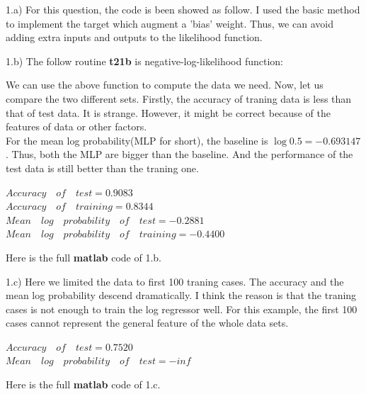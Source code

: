 \documentclass{article}
\begin{document}
1.a) For this question, the code is been showed as follow. I used the basic method to implement the target which augment a 'bias' weight.
Thus, we can avoid adding extra inputs and outputs to the likelihood function.



1.b) The follow routine \textbf{t21b} is negative-log-likelihood function:



We can use the above function to compute the data we need. Now, let us compare the two different sets. Firstly, the accuracy of traning data is
less than that of test data. It is strange. However, it might be correct because of the features of data or other factors. \\
For the mean log probability(MLP for short), the baseline is $\log{0.5} = -0.693147$. Thus, both the MLP are bigger than the baseline.
And the performance of the test data is still better than the traning one.

\begin{center}
$Accuracy\quad of\quad test = 0.9083$ \\
$Accuracy\quad of\quad training = 0.8344$ \\
$Mean\quad log\quad probability\quad of\quad test= -0.2881$ \\
$Mean\quad log\quad probability\quad of\quad training= -0.4400$
 \end{center}

Here is the full \textbf{matlab} code of 1.b.



1.c) Here we limited the data to first 100 traning cases. The accuracy and the mean log probability descend dramatically. I think the reason
is that the traning cases is not enough to train the log regressor well. For this example, the first 100 cases cannot represent the general 
feature of the whole data sets.

\begin{center}
$Accuracy\quad of\quad test = 0.7520$ \\
$Mean\quad log\quad probability\quad of\quad test= -inf$ \\
 \end{center}

Here is the full \textbf{matlab} code of 1.c.


\end{document}
